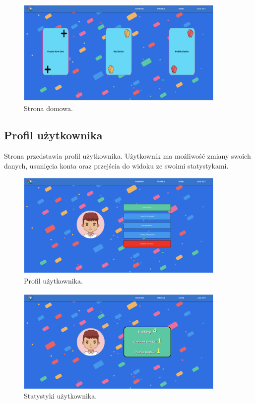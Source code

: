 \begin{figure}[H]
    \centering
    \includegraphics[width=0.9\textwidth]{chapters/chapter_10/images_web/web_home}
    \caption{Strona domowa.}
    \label{img:web_home}
\end{figure}


\subsection{Profil użytkownika}
Strona przedstawia profil użytkownika. Użytkownik ma możliwość zmiany swoich danych, usunięcia konta oraz przejścia do widoku ze swoimi statystykami.


\begin{figure}[H]
    \centering
    \includegraphics[width=0.9\textwidth]{chapters/chapter_10/images_web/web_profile}
    \caption{Profil użytkownika.}
    \label{img:web_profile}
\end{figure}


\begin{figure}[H]
    \centering
    \includegraphics[width=0.9\textwidth]{chapters/chapter_10/images_web/web_stats}
    \caption{Statystyki użytkownika.}
    \label{img:web_stats}
\end{figure}


